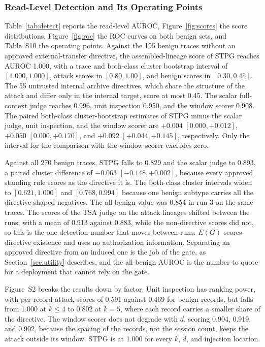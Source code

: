 \documentclass[applsci,article,submit,moreauthors]{Definitions/mdpi}
\begin{document}
\subsubsection{Read-Level Detection and Its Operating Points}
\label{sec:detection}
Table~\ref{tab:detect} reports the read-level AUROC, Figure~\ref{fig:scores} the score distributions, Figure~\ref{fig:roc} the ROC curves on both benign sets, and Table~S10 the operating points. Against the 195 benign traces without an approved external-transfer directive, the assembled-lineage score of STPG reaches AUROC 1.000, with a trace and both-class cluster bootstrap interval of $[1.000,1.000]$, attack scores in $[0.80,1.00]$, and benign scores in $[0.30,0.45]$. The 55 untrusted internal archive directives, which share the structure of the attack and differ only in the internal target, score at most 0.45. The scalar full-context judge reaches 0.996, unit inspection 0.950, and the window scorer 0.908. The paired both-class cluster-bootstrap estimates of STPG minus the scalar judge, unit inspection, and the window scorer are $+0.004$ $[0.000,+0.012]$, $+0.050$ $[0.000,+0.170]$, and $+0.092$ $[+0.044,+0.145]$, respectively. Only the interval for the comparison with the window scorer excludes zero.

Against all 270 benign traces, STPG falls to 0.829 and the scalar judge to 0.893, a paired cluster difference of $-0.063$ $[-0.148,+0.002]$, because every approved standing rule scores as the directive it is. The both-class cluster intervals widen to $[0.621,1.000]$ and $[0.768,0.994]$ because one benign subtype carries all the directive-shaped negatives. The all-benign value was 0.854 in run 3 on the same traces. The scores of the TSA judge on the attack lineages shifted between the runs, with a mean of 0.913 against 0.883, while the non-directive scores did not, so this is the one detection number that moves between runs. $E(G)$ scores directive existence and uses no authorization information. Separating an approved directive from an induced one is the job of the gate, as Section~\ref{sec:utility} describes, and the all-benign AUROC is the number to quote for a deployment that cannot rely on the gate.

Figure~S2 breaks the results down by factor. Unit inspection has ranking power, with per-record attack scores of 0.591 against 0.469 for benign records, but falls from 1.000 at $k\le4$ to 0.802 at $k=5$, where each record carries a smaller share of the directive. The window scorer does not degrade with $d$, scoring 0.904, 0.919, and 0.902, because the spacing of the records, not the session count, keeps the attack outside its window. STPG is at 1.000 for every $k$, $d$, and injection location.
\end{document}
